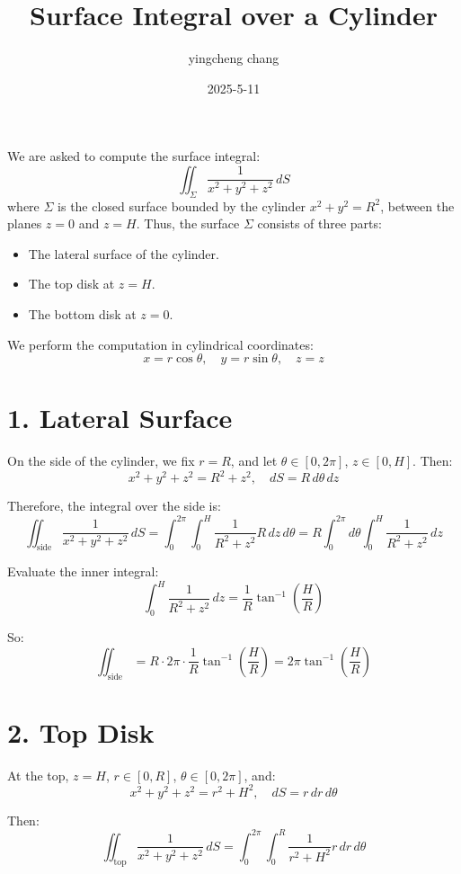 \documentclass[12pt]{article}
\title{Surface Integral over a Cylinder}
\author{yingcheng chang}
\date{2025-5-11}
\begin{document}
\maketitle

We are asked to compute the surface integral:
\[
\iint_\Sigma \frac{1}{x^2 + y^2 + z^2}\,dS
\]
where \( \Sigma \) is the closed surface bounded by the cylinder \( x^2 + y^2 = R^2 \), between the planes \( z = 0 \) and \( z = H \). Thus, the surface \( \Sigma \) consists of three parts:

\begin{itemize}
  \item The lateral surface of the cylinder.
  \item The top disk at \( z = H \).
  \item The bottom disk at \( z = 0 \).
\end{itemize}

We perform the computation in cylindrical coordinates:
\[
x = r\cos\theta,\quad y = r\sin\theta,\quad z = z
\]

\section*{1. Lateral Surface}

On the side of the cylinder, we fix \( r = R \), and let \( \theta \in [0, 2\pi] \), \( z \in [0, H] \). Then:
\[
x^2 + y^2 + z^2 = R^2 + z^2,\quad dS = R\,d\theta\,dz
\]

Therefore, the integral over the side is:
\[
\iint_{\text{side}} \frac{1}{x^2 + y^2 + z^2}\,dS = \int_0^{2\pi} \int_0^H \frac{1}{R^2 + z^2} R\,dz\,d\theta
= R \int_0^{2\pi} d\theta \int_0^H \frac{1}{R^2 + z^2}\,dz
\]

Evaluate the inner integral:
\[
\int_0^H \frac{1}{R^2 + z^2}\,dz = \frac{1}{R} \tan^{-1}\left( \frac{H}{R} \right)
\]

So:
\[
\iint_{\text{side}} = R \cdot 2\pi \cdot \frac{1}{R} \tan^{-1}\left( \frac{H}{R} \right)
= 2\pi \tan^{-1}\left( \frac{H}{R} \right)
\]

\section*{2. Top Disk}

At the top, \( z = H \), \( r \in [0, R] \), \( \theta \in [0, 2\pi] \), and:
\[
x^2 + y^2 + z^2 = r^2 + H^2,\quad dS = r\,dr\,d\theta
\]

Then:
\[
\iint_{\text{top}} \frac{1}{x^2 + y^2 + z^2}\,dS = \int_0^{2\pi} \int_0^R \frac{1}{r^2 + H^2} r\,dr\,d\theta
\]
\end{document}
